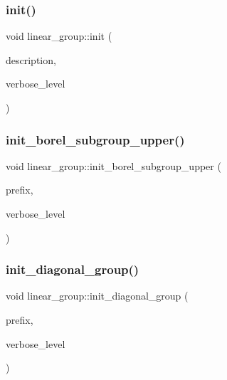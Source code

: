 \mbox{\label{classlinear__group_a8119aa9b882192ab422b12614b259f28}} 
\subsubsection{\texorpdfstring{init()}{init()}}
{\footnotesize\ttfamily void linear\+\_\+group\+::init (\begin{DoxyParamCaption}\item[{\mbox{\hyperlink{classlinear__group__description}{linear\+\_\+group\+\_\+description}} $\ast$}]{description,  }\item[{\mbox{\hyperlink{galois_8h_a09fddde158a3a20bd2dcadb609de11dc}{I\+NT}}}]{verbose\+\_\+level }\end{DoxyParamCaption})}

\mbox{\label{classlinear__group_a7d25e5c41bc3bf53a0c5063082055344}} 
\subsubsection{\texorpdfstring{init\+\_\+borel\+\_\+subgroup\+\_\+upper()}{init\_borel\_subgroup\_upper()}}
{\footnotesize\ttfamily void linear\+\_\+group\+::init\+\_\+borel\+\_\+subgroup\+\_\+upper (\begin{DoxyParamCaption}\item[{\mbox{\hyperlink{galois_8h_ab6cc7b4aeb6ea31aba2b3fbfc83ff5e6}{B\+Y\+TE}} $\ast$}]{prefix,  }\item[{\mbox{\hyperlink{galois_8h_a09fddde158a3a20bd2dcadb609de11dc}{I\+NT}}}]{verbose\+\_\+level }\end{DoxyParamCaption})}

\mbox{\label{classlinear__group_aaeeb26cf2ee1891b04d8925ddd1c18dd}} 
\subsubsection{\texorpdfstring{init\+\_\+diagonal\+\_\+group()}{init\_diagonal\_group()}}
{\footnotesize\ttfamily void linear\+\_\+group\+::init\+\_\+diagonal\+\_\+group (\begin{DoxyParamCaption}\item[{\mbox{\hyperlink{galois_8h_ab6cc7b4aeb6ea31aba2b3fbfc83ff5e6}{B\+Y\+TE}} $\ast$}]{prefix,  }\item[{\mbox{\hyperlink{galois_8h_a09fddde158a3a20bd2dcadb609de11dc}{I\+NT}}}]{verbose\+\_\+level }\end{DoxyParamCaption})}

